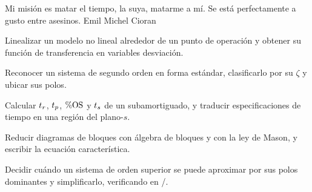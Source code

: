 
  {Mi misión es matar el tiempo, la suya, matarme a mí. Se está perfectamente a gusto entre asesinos.}
  {Emil Michel Cioran}

\begin{objetivos}
  \item Linealizar un modelo no lineal alrededor de un punto de operación y obtener su función de transferencia en variables desviación.
  \item Reconocer un sistema de segundo orden en forma estándar, clasificarlo por su $\zeta$ y ubicar sus polos.
  \item Calcular $t_r$, $t_p$, $\%\mathrm{OS}$ y $t_s$ de un subamortiguado, y traducir especificaciones de tiempo en una región del plano-$s$.
  \item Reducir diagramas de bloques con álgebra de bloques y con la ley de Mason, y escribir la ecuación característica.
  \item Decidir cuándo un sistema de orden superior se puede aproximar por sus polos dominantes y simplificarlo, verificando en \matlab/\simulink.
\end{objetivos}













